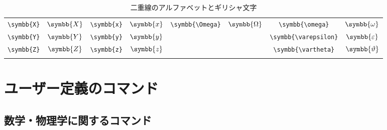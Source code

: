 \begin{longtable}{cccccccc}
    \verb|\symbb{X}| & \(\symbb{X}\) & \verb|\symbb{x}| & \(\symbb{x}\) & \verb|\symbb{\Omega}|   & \(\symbb{\Omega}\)   & \verb|\symbb{\omega}|      & \(\symbb{\omega}\)      \\
    \verb|\symbb{Y}| & \(\symbb{Y}\) & \verb|\symbb{y}| & \(\symbb{y}\) &                         &                      & \verb|\symbb{\varepsilon}| & \(\symbb{\varepsilon}\) \\
    \verb|\symbb{Z}| & \(\symbb{Z}\) & \verb|\symbb{z}| & \(\symbb{z}\) &                         &                      & \verb|\symbb{\vartheta}|   & \(\symbb{\vartheta}\)   \\
    \bottomrule
    \caption{二重線のアルファベットとギリシャ文字}
    \label{tab:double_letters}
\end{longtable}

\section{ユーザー定義のコマンド}

\subsection{数学・物理学に関するコマンド}

